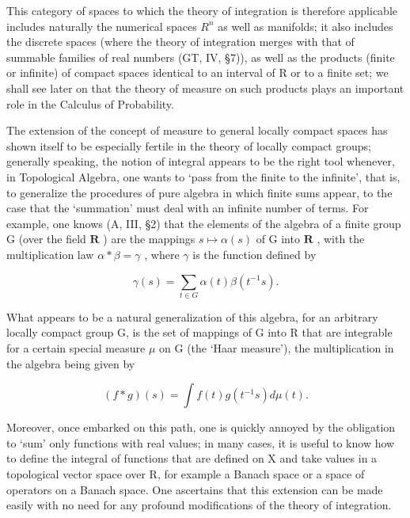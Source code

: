 This category of spaces to which the theory of integration is therefore applicable includes naturally the numerical spaces \(R^{n}\) as well as manifolds; it also includes the discrete spaces (where the theory of integration merges with that of summable families of real numbers (GT, IV, §7)), as well as the products (finite or infinite) of compact spaces identical to an interval of R or to a finite set; we shall see later on that the theory of measure on such products plays an important role in the Calculus of Probability.

The extension of the concept of measure to general locally compact spaces has shown itself to be especially fertile in the theory of locally compact groups; generally speaking, the notion of integral appears to be the right tool whenever, in Topological Algebra, one wants to `pass from the finite to the infinite', that is, to generalize the procedures of pure algebra in which finite sums appear, to the case that the `summation' must deal with an infinite number of terms. For example, one knows (A, III, §2) that the elements of the algebra of a finite group G (over the field \(\mathbf{R}\) ) are the mappings \(s \mapsto \alpha(s)\) of G into \(\mathbf{R}\) , with the multiplication law \(\alpha * \beta = \gamma\) , where \(\gamma\) is the function defined by

\[
\gamma (s) = \sum_ {t \in G} \alpha (t) \beta (t ^ {- 1} s).
\]

What appears to be a natural generalization of this algebra, for an arbitrary locally compact group G, is the set of mappings of G into R that are integrable for a certain special measure \(\mu\) on G (the `Haar measure'), the multiplication in the algebra being given by

\[
(f * g) (s) = \int f (t) g (t ^ {- 1} s) d \mu (t).
\]

Moreover, once embarked on this path, one is quickly annoyed by the obligation to `sum' only functions with real values; in many cases, it is useful to know how to define the integral of functions that are defined on X and take values in a topological vector space over R, for example a Banach space or a space of operators on a Banach space. One ascertains that this extension can be made easily with no need for any profound modifications of the theory of integration.

